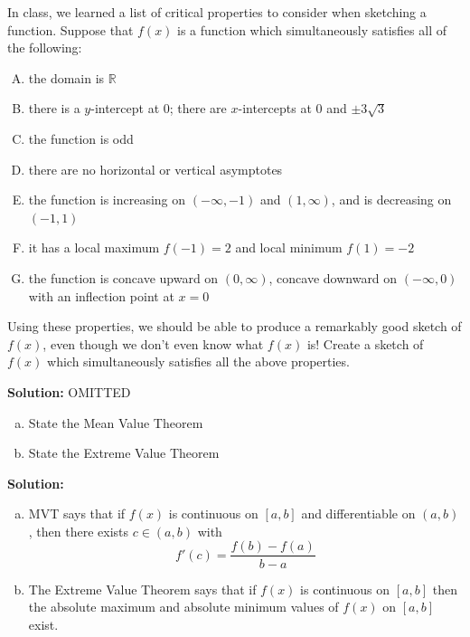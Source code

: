 \documentclass[11pt]{exam}
\theoremstyle{definition}
\begin{document}
\begin{questions}
\newpage
\question[6]
In class, we learned a list of critical properties to consider when sketching a function.
Suppose that $f(x)$ is a function which simultaneously satisfies all of the following:
\begin{enumerate}[(A)]
\item the domain is $\mathbb{R}$
\item there is a $y$-intercept at $0$; there are $x$-intercepts at $0$ and $\pm 3\sqrt{3}$
\item the function is odd
\item there are no horizontal or vertical asymptotes
\item the function is increasing on $(-\infty,-1)$ and $(1,\infty)$, and is decreasing on $(-1,1)$
\item it has a local maximum $f(-1)=2$ and local minimum $f(1)=-2$
\item the function is concave upward on $(0,\infty)$, concave downward on $(-\infty,0)$ with an inflection point at $x=0$
\end{enumerate}
Using these properties, we should be able to produce a remarkably good sketch of $f(x)$, even though we don't even know what $f(x)$ is!  Create a sketch of $f(x)$ which simultaneously satisfies all the above properties.

\textbf{Solution:} OMITTED

\newpage
\question[10]\mbox{}
\begin{enumerate}[(a)]
\item  State the Mean Value Theorem
\vspace{2in}
\item  State the Extreme Value Theorem
\end{enumerate}
\textbf{Solution:}  
\begin{enumerate}[(a)]
\item  MVT says that if $f(x)$ is continuous on $[a,b]$ and differentiable on $(a,b)$, then there exists $c\in (a,b)$ with
$$f'(c) = \frac{f(b)-f(a)}{b-a}$$
\vspace{2in}
\item  The Extreme Value Theorem says that if $f(x)$ is continuous on $[a,b]$ then the absolute maximum and absolute minimum values of $f(x)$ on $[a,b]$ exist.
\end{enumerate}




\end{questions}
\end{document}
